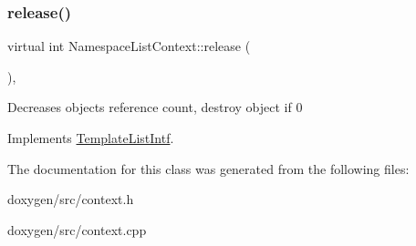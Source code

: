 \mbox{\label{class_namespace_list_context_a8395f4caf4473517e10e0375efe0e419}} 
\subsubsection{\texorpdfstring{release()}{release()}}
{\footnotesize\ttfamily virtual int Namespace\+List\+Context\+::release (\begin{DoxyParamCaption}{ }\end{DoxyParamCaption})\hspace{0.3cm}{\ttfamily [inline]}, {\ttfamily [virtual]}}

Decreases object\textquotesingle{}s reference count, destroy object if 0 

Implements \mbox{\hyperlink{class_template_list_intf_a0c53169c740c09dac47efc62bbe39674}{Template\+List\+Intf}}.



The documentation for this class was generated from the following files\+:\begin{DoxyCompactItemize}
\item 
doxygen/src/context.\+h\item 
doxygen/src/context.\+cpp\end{DoxyCompactItemize}

